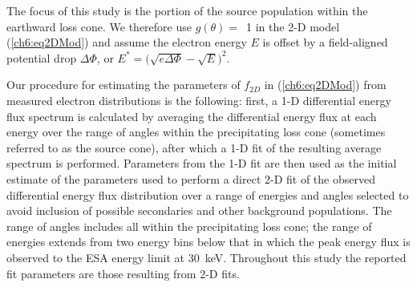   \begin{figure}
    \centering
  \end{figure}


  The focus of this study is the portion of the source population within the
  earthward loss cone. We therefore use $g(\theta) =$~1 in the 2-D model
  (\ref{ch6:eq2DMod}) and assume the electron energy $E$ is offset by a
  field-aligned potential drop $\Delta \Phi$, or $E^* = \big( \sqrt{e \Delta
    \Phi} - \sqrt{E} \big)^2$.

  Our procedure for estimating the parameters of $f_{2D}$ in (\ref{ch6:eq2DMod})
  from measured electron distributions is the following: first, a 1-D
  differential energy flux spectrum is calculated by averaging the differential
  energy flux at each energy over the range of angles within the precipitating
  loss cone (sometimes referred to as the source cone), after which a 1-D fit of
  the resulting average spectrum is performed. Parameters from the 1-D fit are
  then used as the initial estimate of the parameters used to perform a direct
  2-D fit of the observed differential energy flux distribution over a range of
  energies and angles selected to avoid inclusion of possible secondaries and
  other background populations. The range of angles includes all within the
  precipitating loss cone; the range of energies extends
  from two energy bins below that in which the peak energy flux is observed to
  the ESA energy limit at 30~keV. Throughout this study the reported fit
  parameters are those resulting from 2-D fits.

